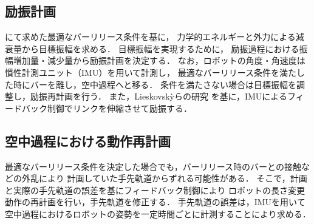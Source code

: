 \begin{small}
\subsection{励振計画}
\vspace{-1mm}
にて求めた最適なバーリリース条件を基に，
力学的エネルギーと外力による減衰量から目標振幅を求める．
目標振幅を実現するために，
励振過程における振幅増加量・減少量から励振計画を決定する．
なお，ロボットの角度・角速度は慣性計測ユニット（IMU）を用いて計測し，
最適なバーリリース条件を満たした時にバーを離し，空中過程へと移る．
条件を満たさない場合は目標振幅を調整し，励振再計画を行う．
また，Lieskovsk{\`y}らの研究\cite{lieskovsky2023optimal}
を基に，IMUによるフィードバック制御でリンクを伸縮させて励振する．
\subsection{空中過程における動作再計画}
\vspace{-1mm}
最適なバーリリース条件を決定した場合でも，バーリリース時のバーとの接触などの外乱により
計画していた手先軌道からずれる可能性がある．
そこで，計画と実際の手先軌道の誤差を基にフィードバック制御により
ロボットの長さ変更動作の再計画を行い，手先軌道を修正する．
手先軌道の誤差は，IMUを用いて空中過程におけるロボットの姿勢を一定時間ごとに計測することにより求める．
\vspace{-2.5mm}

\end{small}
